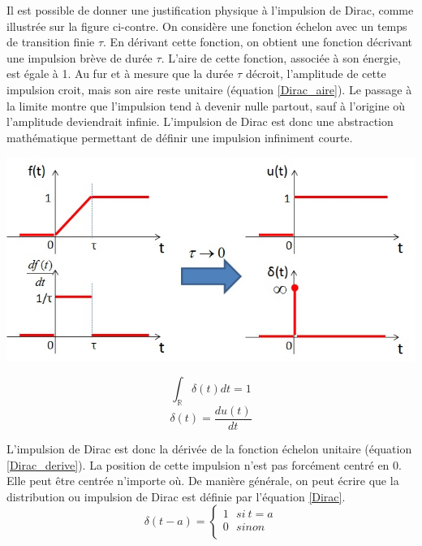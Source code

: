 	
	\begin{minipage}[l]{0.45\linewidth}
			Il est possible de donner une justification physique à l'impulsion de Dirac, comme illustrée sur la figure ci-contre. On considère une fonction échelon avec un temps de transition finie $\tau$. En dérivant cette fonction, on obtient une fonction décrivant une impulsion brève de durée $\tau$. L'aire de cette fonction, associée à son énergie, est égale à 1. Au fur et à mesure que la durée $\tau$ décroit, l'amplitude de cette impulsion croit, mais son aire reste unitaire (équation \ref{Dirac_aire}). Le passage à la limite montre que l'impulsion tend à devenir nulle partout, sauf à l'origine où l'amplitude deviendrait infinie. L'impulsion de Dirac est donc une abstraction mathématique permettant de définir une impulsion infiniment courte.	
	\end{minipage} \hfill
	\begin{minipage}[r]{0.55\linewidth}
		\includegraphics[scale=0.5]{images/generation_Dirac.jpg} 	
	\end{minipage}
	\vspace{0.5\baselineskip}
	
	\begin{equation}\label{Dirac_aire}
	\int_{\mathbb{R}}\delta (t)dt = 1 	
	\end{equation}
	\begin{equation}\label{Dirac_derive}
	\delta (t) = \frac{du(t)}{dt}	 	
	\end{equation}
	
	
	L'impulsion de Dirac est donc la dérivée de la fonction échelon unitaire (équation \ref{Dirac_derive}). La position de cette impulsion n'est pas forcément centré en 0. Elle peut être centrée n'importe où. De manière générale, on peut écrire que la distribution ou impulsion de Dirac est définie par l'équation \ref{Dirac}.
	\begin{equation}\label{Dirac}
	\delta (t-a) = \left \{
	\begin{array}{l}
	1~~~si~t = a \\
	0~~~sinon \\
	\end{array}
	\right . 	
	\end{equation}
	
